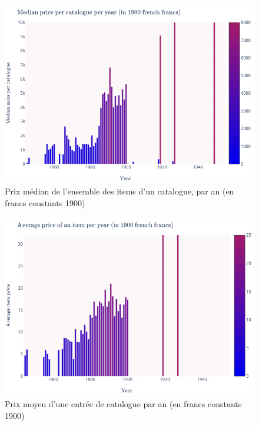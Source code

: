 \begin{figure}[p]
	\includegraphics[width=\textwidth]{annexes/fig_med_cat.png}
	\caption{Prix médian de l'ensemble des items d'un catalogue, par an (en francs constants 1900)}
	\label{appendix:medcat}
\end{figure}

\begin{figure}[p]
	\includegraphics[width=\textwidth]{annexes/fig_avg_itm.png}
	\caption{Prix moyen d'une entrée de catalogue par an (en francs constants 1900)}
	\label{appendix:avgitm}
\end{figure}

